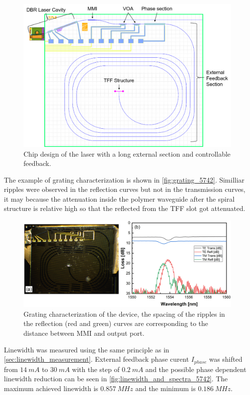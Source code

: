 \begin{figure}[H]
    \centering
    \includegraphics[width=0.8\linewidth]{figures/5742_spiral_comment.png}
    \caption{Chip design of the laser with a long external section and controllable feedback.}
    \label{fig:grating_5742}
\end{figure}

The example of grating characterization is shown in \autoref{fig:grating_5742}. Similliar ripples were observed in the reflection curves but not in the transmission curves, it may because the attenuation inside the polymer waveguide after the spiral structure is relative high so that the reflected from the TFF slot got attenuated.

\begin{figure}[ht]
    \centering
    \includegraphics[width=\linewidth]{figures/grating_5742.png}
    \caption{Grating characterization of the device, the spacing of the ripples in the reflection (red and green) curves are corresponding to the distance between MMI and output port.}
    \label{fig:grating_5742}
\end{figure}

Linewidth was measured using the same principle as in \autoref{sec:linewidth_measurement}. External feedback phase curent $I_{phase}$ was shifted from $14 \ mA$ to $30 \ mA$ with the step of $0.2 \ mA$ and the possible phase dependent linewidth reduction can be seen in \autoref{fig:linewidth_and_spectra_5742}. The maximum achieved linewidth is $0.857 \ MHz$ and the minimum is $0.186 \ MHz$.

